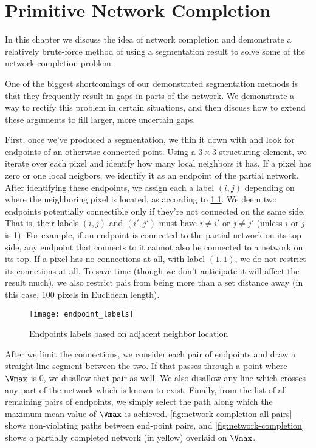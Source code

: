 \chapter{Primitive Network Completion}

In this chapter we discuss the idea of network completion and demonstrate a relatively brute-force method of using a segmentation result to solve some of the network completion problem.

One of the biggest shortcomings of our demonstrated segmentation methods is that they frequently result in gaps in parts of the network. We demonstrate a way to rectify this problem in certain situations, and then discuss how to extend these arguments to fill larger, more uncertain gaps.

First, once we've produced a segmentation, we thin it down with \cite{thinning} and look for endpoints of an otherwise connected point. Using a $3\times 3$ structuring element, we iterate over each pixel and identify how many local neighbors it has. If a pixel has zero or one local neigbors, we identify it as an endpoint of the partial network. After identifying these endpoints, we assign each a label $(i,j)$ depending on where the neighboring pixel is located, as according to \cref{fig:endpoint_labels}. We deem two endpoints potentially connectible only if they're not connected on the same side. That is, their labels $(i,j)$ and $(i',j')$ must have $i\ne i'$ or $j\ne j'$ (unless $i$ or $j$ is 1). For example, if an endpoint is connected to the partial network on its top side, any endpoint that connects to it cannot also be connected to a network on its top. If a pixel has no connections at all, with label $(1,1)$, we do not restrict its connetions at all. To save time (though we don't anticipate it will affect the result much), we also restrict pais from being more than a set distance away (in this case, 100 pixels in Euclidean length).

\begin{figure}
	\texttt{[image: endpoint\_labels]}
	\caption{Endpoints labels based on adjacent neighbor location}
	\label{fig:endpoint_labels}
\end{figure}

After we limit the connections, we consider each pair of endpoints and draw a straight line segment between the two. If that passes through a point where $\Vmax$ is 0, we disallow that pair as well. We also disallow any line which crosses any part of the network which is known to exist.
Finally, from the list of all remaining pairs of endpoints, we simply select the path along which the maximum mean value of $\Vmax$ is achieved. \cref{fig:network-completion-all-pairs} shows non-violating paths between end-point pairs, and \cref{fig:network-completion} shows a partially completed network (in yellow) overlaid on $\Vmax$.




